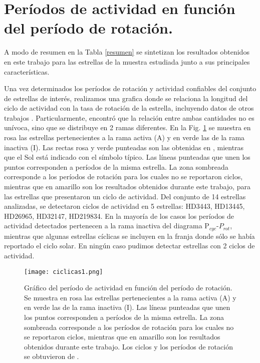 \documentclass[baaa]{baaa}
\begin{document}
\section{Períodos de actividad en función del período de rotación.}

A modo de resumen en la Tabla \ref{resumen} se sintetizan los resultados obtenidos en este trabajo para las estrellas de la muestra estudiada junto a sus principales características.



Una vez determinados los períodos de rotación y actividad confiables del conjunto de estrellas de interés, realizamos una grafica donde se relaciona la longitud del ciclo de actividad con la tasa de rotación de la estrella, incluyendo datos de otros trabajos \citep{Saar99,Metcalfe10,Metcalfe13,Hall07,BohmVitense07}. Particularmente, \cite{BohmVitense07} encontró que la relación entre ambas cantidades no es unívoca, sino que se distribuye en 2 ramas diferentes. En la Fig. \ref{Metcalfe+hd} se muestra en rosa las estrellas pertenecientes a la rama activa (A) y en verde las de la rama inactiva (I). Las rectas rosa y verde punteadas son las obtenidas en \cite{BohmVitense07}, mientras que el Sol está indicado con el símbolo típico. Las líneas punteadas que unen los puntos corresponden a períodos de la misma estrella. La zona sombreada corresponde a los períodos de rotación para los cuales no se reportaron ciclos, mientras que en amarillo son los resultados obtenidos durante este trabajo, para las estrellas que presentaron un ciclo de actividad. Del conjunto de 14 estrellas analizadas, se detectaron ciclos de actividad en 5 estrellas: HD3443, HD13445, HD26965, HD32147, HD219834. En la mayoría de los casos los períodos de actividad detectados pertenecen a la rama inactiva del diagrama P$_{cyc}$-$P_{rot}$,  mientras que algunas estrellas cíclicas se incluyen en la franja donde sólo se había reportado el ciclo solar. En ningún caso pudimos detectar estrellas con 2 ciclos de actividad.

\begin{figure}[hbt!]
\centering
\texttt{[image: ciclicas1.png]}
\caption{Gráfico del período de actividad en función del período de rotación. Se muestra en rosa las estrellas pertenecientes a la rama activa (A) y en verde las de la rama inactiva (I). Las líneas punteadas que unen los puntos corresponden a períodos de la misma estrella. La zona sombreada corresponde a los períodos de rotación para los cuales no se reportaron ciclos, mientras que en amarillo son los resultados obtenidos durante este trabajo. Los ciclos y los períodos de rotación se obtuvieron de \cite{Saar99,Metcalfe10,Metcalfe13,Hall07,BohmVitense07}.}
\label{Metcalfe+hd}
\end{figure}
\end{document}
